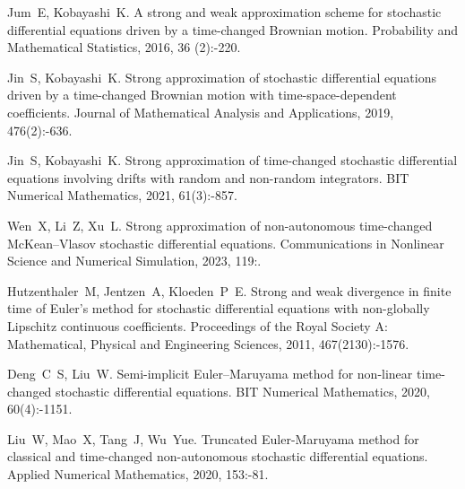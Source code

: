 \begin{thebibliography}{99}
    Jum~E, Kobayashi~K.
    \newblock A strong and weak approximation scheme for stochastic differential
    equations driven by a time-changed {Brownian} motion\allowbreak[J].
    \newblock Probability and Mathematical Statistics, 2016, 36\allowbreak
    (2):-220.
    
    Jin~S, Kobayashi~K.
    \newblock Strong approximation of stochastic differential equations driven by a
    time-changed {Brownian} motion with time-space-dependent
    coefficients\allowbreak[J].
    \newblock Journal of Mathematical Analysis and Applications, 2019,
    476\allowbreak (2):-636.
    
    Jin~S, Kobayashi~K.
    \newblock Strong approximation of time-changed stochastic differential
    equations involving drifts with random and non-random
    integrators\allowbreak[J].
    \newblock BIT Numerical Mathematics, 2021, 61\allowbreak (3):-857.
    
    Wen~X, Li~Z, Xu~L.
    \newblock Strong approximation of non-autonomous time-changed {McKean–Vlasov}
    stochastic differential equations\allowbreak[J].
    \newblock Communications in Nonlinear Science and Numerical Simulation, 2023,
    119:.
    
    Hutzenthaler~M, Jentzen~A, Kloeden~P~E.
    \newblock Strong and weak divergence in finite time of {Euler's} method for
    stochastic differential equations with non-globally {Lipschitz} continuous
    coefficients\allowbreak[J].
    \newblock Proceedings of the Royal Society A: Mathematical, Physical and
    Engineering Sciences, 2011, 467\allowbreak (2130):-1576.
    
    Deng~C~S, Liu~W.
    \newblock Semi-implicit {Euler–Maruyama} method for non-linear time-changed
    stochastic differential equations\allowbreak[J].
    \newblock BIT Numerical Mathematics, 2020, 60\allowbreak (4):-1151.
    
    Liu~W, Mao~X, Tang~J, Wu~Yue.
    \newblock Truncated {Euler-Maruyama} method for classical and time-changed
    non-autonomous stochastic differential equations\allowbreak[J].
    \newblock Applied Numerical Mathematics, 2020, 153:-81.
    

\end{thebibliography}
